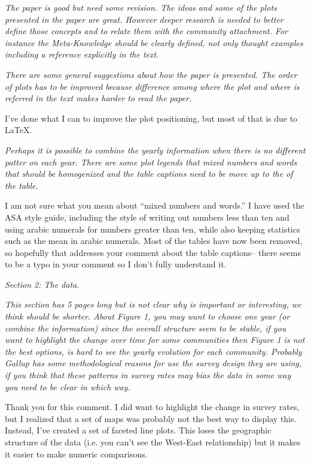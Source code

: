 \documentclass[12pt]{article}
\begin{document}
\emph{The paper is good but need some revision. The ideas and some of the plots presented in the paper are great. However deeper research is needed to better define those concepts and to relate them with the community attachment. For instance the Meta-Knowledge should be clearly defined, not only thought examples including a reference explicitly in the text.}

\emph{There are some general suggestions about how the paper is presented. The order of plots has to be improved because difference among where the plot and where is referred in the text makes harder to read the paper.}

I've done what I can to improve the plot positioning, but most of that is due to \LaTeX. 

\emph{Perhaps it is possible to combine the yearly information when there is no different patter on each year. There are some plot legends that mixed numbers and words that should be homogenized and the table captions need to be move up to the of the table.}

I am not sure what you mean about ``mixed numbers and words.'' I have used the ASA style guide, including the style of writing out numbers less than ten and using arabic numerals for numbers greater than ten, while also keeping statistics such as the mean in arabic numerals. Most of the tables have now been removed, so hopefully that addresses your comment about the table captions-- there seems to be a typo in your comment so I don't fully understand it. 

\emph{Section 2: The data.}

\emph{This section has 5 pages long but is not clear why is important or interesting, we think should be shorter. About Figure 1, you may want to choose one year (or combine the information) since the overall structure seem to be stable, if you want to highlight the change over time for some communities then Figure 1 is not the best options, is hard to see the yearly evolution for each community. Probably Gallup has some methodological reasons for use the survey design they are using, if you think that these patterns in survey rates may bias the data in some way you need to be clear in which way.}

Thank you for this comment. I did want to highlight the change in survey rates, but I realized that a set of maps was probably not the best way to display this. Instead, I've created a set of faceted line plots. This loses the geographic structure of the data (i.e. you can't see the West-East relationship) but it makes it easier to make numeric comparisons. 
\end{document}
